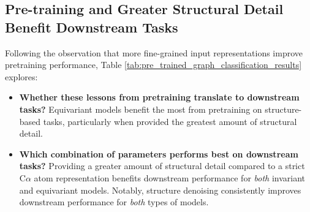 

\subsection{Pre-training and Greater Structural Detail Benefit Downstream Tasks}

Following the observation that more fine-grained input representations improve pretraining performance, Table \ref{tab:pre_trained_graph_classification_results} explores:
\begin{itemize}
    \item \textbf{Whether these lessons from pretraining translate to downstream tasks?} Equivariant models benefit the most from pretraining on structure-based tasks, particularly when provided the greatest amount of structural detail.
    \item \textbf{Which combination of parameters performs best on downstream tasks?} Providing a greater amount of structural detail compared to a strict C$\alpha$ atom representation benefits downstream performance for \textit{both} invariant and equivariant models.
    Notably, structure denoising consistently improves downstream performance for \textit{both} types of models.
\end{itemize}


